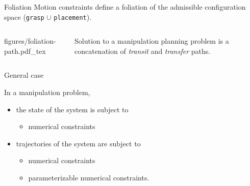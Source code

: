 %
%

\begin {frame} {Foliation}
  Motion constraints define a foliation of the admissible configuration space (\texttt{grasp} $\cup$ \texttt{placement}).
  \begin{columns}
    \centering
    \def\svgwidth {\linewidth}
                  {\tiny
                    \graphicspath{{./figures/}}
                     {figures/foliation-path.pdf_tex}
                }
    \centering
    Solution to a manipulation planning problem is a concatenation of \textit{transit} and \textit{transfer} paths.
  \end {columns}

\end {frame}

%
%

\begin {frame} {General case}

  In a manipulation problem,
  \begin{itemize}
  \item the state of the system is subject to
    \begin {itemize}
      \item numerical constraints
    \end {itemize}
    \pause
  \item trajectories of the system are subject to
    \begin {itemize}
    \item numerical constraints
    \item parameterizable numerical constraints.
    \end {itemize}
  \end{itemize}
\end {frame}

%
%

